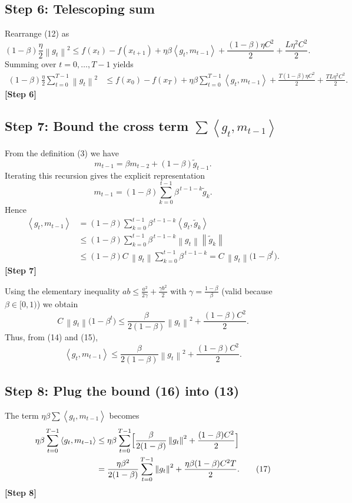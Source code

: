 \documentclass{article}
\newcommand{\norm}[1]{\left\lVert#1\right\rVert}
\newcommand{\inner}[2]{\left\langle #1,#2\right\rangle}
\begin{document}
\subsection*{Step 6: Telescoping sum}
Rearrange (12) as
\[
(1-\beta)\frac{\eta}{2}\norm{g_{t}}^{2}
\le f(x_{t})-f(x_{t+1})
+\eta\beta\inner{g_{t}}{m_{t-1}}
+\frac{(1-\beta)\eta C^{2}}{2}
+\frac{L\eta^{2}C^{2}}{2}.
\]
Summing over $t=0,\dots,T-1$ yields
\begin{align}
(1-\beta)\frac{\eta}{2}\sum_{t=0}^{T-1}\norm{g_{t}}^{2}
&\le f(x_{0})-f(x_{T})
+\eta\beta\sum_{t=0}^{T-1}\inner{g_{t}}{m_{t-1}}
+ \frac{T(1-\beta)\eta C^{2}}{2}
+ \frac{TL\eta^{2}C^{2}}{2}. \tag{13}
\end{align}
\textbf{[Step 6]}

\subsection*{Step 7: Bound the cross term $\sum\inner{g_{t}}{m_{t-1}}$}
From the definition (3) we have
\[
m_{t-1}= \beta m_{t-2}+(1-\beta)\tilde g_{t-1}.
\]
Iterating this recursion gives the explicit representation
\[
m_{t-1}= (1-\beta)\sum_{k=0}^{t-1}\beta^{\,t-1-k}\tilde g_{k}.
\]
Hence
\begin{align}
\inner{g_{t}}{m_{t-1}}
&= (1-\beta)\sum_{k=0}^{t-1}\beta^{\,t-1-k}\inner{g_{t}}{\tilde g_{k}} \nonumber\\
&\le (1-\beta)\sum_{k=0}^{t-1}\beta^{\,t-1-k}\norm{g_{t}}\norm{\tilde g_{k}} \nonumber\\
&\le (1-\beta)C\,\norm{g_{t}}\sum_{k=0}^{t-1}\beta^{\,t-1-k}
= C\,\norm{g_{t}}\bigl(1-\beta^{t}\bigr). \tag{14}
\end{align}
\textbf{[Step 7]}

Using the elementary inequality $ab\le \frac{a^{2}}{2\gamma}+\frac{\gamma b^{2}}{2}$
with $\gamma=\frac{1-\beta}{\beta}$ (valid because $\beta\in[0,1)$) we obtain
\[
C\,\norm{g_{t}}\bigl(1-\beta^{t}\bigr)
\le \frac{\beta}{2(1-\beta)}\norm{g_{t}}^{2}
   +\frac{(1-\beta)C^{2}}{2}. \tag{15}
\]
Thus, from (14) and (15),
\[
\inner{g_{t}}{m_{t-1}}
\le \frac{\beta}{2(1-\beta)}\norm{g_{t}}^{2}
   +\frac{(1-\beta)C^{2}}{2}. \tag{16}
\]

\subsection*{Step 8: Plug the bound (16) into (13)}
The term $\eta\beta\sum\inner{g_{t}}{m_{t-1}}$ becomes
\begin{align}
\eta\beta\sum_{t=0}^{T-1}\inner{g_{t}}{m_{t-1}}
&\le \eta\beta\sum_{t=0}^{T-1}
\Bigl[\frac{\beta}{2(1-\beta)}\norm{g_{t}}^{2}
      +\frac{(1-\beta)C^{2}}{2}\Bigr] \nonumber\\
&= \frac{\eta\beta^{2}}{2(1-\beta)}\sum_{t=0}^{T-1}\norm{g_{t}}^{2}
   +\frac{\eta\beta (1-\beta)C^{2}T}{2}. \tag{17}
\end{align}
\textbf{[Step 8]}
\end{document}
